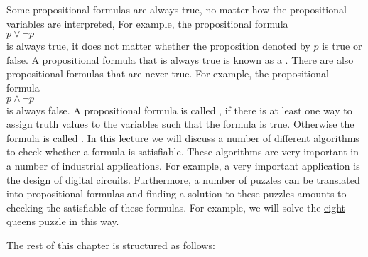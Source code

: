 Some propositional formulas are always true, no matter how the propositional variables are interpreted,
For example, the propositional formula 
\\[0.2cm]
\hspace*{1.3cm}
$p \vee \neg p$
\\[0.2cm]
is always true, it does not matter whether the proposition denoted by $p$ is true or false.  A propositional
formula that is always true is known as a  .  There are also propositional
formulas that are never true.  For example, the propositional formula
\\[0.2cm]
\hspace*{1.3cm}
$p \wedge \neg p$
\\[0.2cm]
is always false.  A propositional formula is called , if there is at least
one way to assign truth values to the variables such that the formula is true.  Otherwise the formula is called
.  In this lecture we will discuss a number of different algorithms to
check whether a formula is satisfiable.  These algorithms are very important in a number of industrial
applications.  For example, a very important application is the design of digital circuits.
Furthermore, a number of puzzles can be translated into propositional formulas and finding a solution to these
puzzles amounts to checking the satisfiable of these formulas.  For example, we will solve the
\href{https://en.wikipedia.org/wiki/Eight_queens_puzzle}{eight queens puzzle} in this way.

The rest of this chapter is structured as follows:

